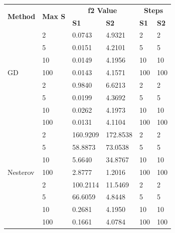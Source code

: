 \documentclass[9pt]{IEEEtran}
\begin{document}
\begin{table}[h!]
    \centering
    \begin{tabular}{|p{1cm}|p{1cm}|p{1.7cm}|p{1.7cm}|p{0.5cm}|p{0.5cm}|}
        \hline
        \multirow{2}{*}{\textbf{Method}} & \multirow{2}{*}{\textbf{Max S}} & \multicolumn{2}{c|}{\textbf{f2 Value}} & \multicolumn{2}{c|}{\textbf{Steps}} \\ \cline{3-4} \cline{5-6}
                                          &                                  & \textbf{S1} & \textbf{S2} & \textbf{S1} & \textbf{S2} \\ \hline
        \multirow{7}{*}{GD}              & 2  & 0.0743  & 4.9321  & 2  & 2 \\ \cline{2-6} 
                                       & 5  & 0.0151  & 4.2101  & 5  & 5 \\ \cline{2-6} 
                                       & 10 & 0.0149  & 4.1956  & 10 & 10 \\ \cline{2-6} 
                                       & 100 & 0.0143  & 4.1571  & 100 & 100 \\ \hline
        \multirow{7}{*}{Polyak}       & 2  & 0.9840  & 6.6213  & 2  & 2 \\ \cline{2-6} 
                                       & 5  & 0.0199  & 4.3692  & 5  & 5 \\ \cline{2-6} 
                                       & 10 & 0.0262  & 4.1973  & 10 & 10 \\ \cline{2-6} 
                                       & 100 & 0.0131  & 4.1104  & 100 & 100 \\ \hline
        \multirow{7}{*}{Nesterov}     & 2  & 160.9209 & 172.8538 & 2 & 2 \\ \cline{2-6} 
                                       & 5  & 58.8873 & 73.0538  & 5 & 5 \\ \cline{2-6} 
                                       & 10 & 5.6640  & 34.8767  & 10 & 10 \\ \cline{2-6} 
                                       & 100 & 2.8777  & 1.2016  & 100 & 100 \\ \hline
        \multirow{7}{*}{AdaGrad}         & 2  & 100.2114 & 11.5469  & 2  & 2 \\ \cline{2-6} 
                                       & 5  & 66.6059  & 4.8448  & 5  & 5 \\ \cline{2-6} 
                                       & 10 & 0.2681   & 4.1950  & 10 & 10 \\ \cline{2-6} 
                                       & 100 & 0.1661  & 4.0784  & 100 & 100 \\ \hline

\end{tabular}
\end{table}
\end{document}
